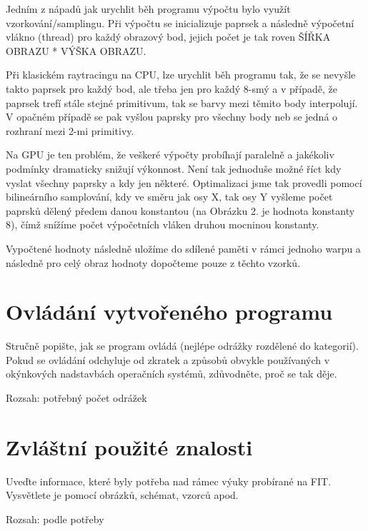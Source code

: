 \documentclass[12pt,a4paper,titlepage,final]{report}
\begin{document}
	\vspace{5mm}
Jedním z nápadů jak urychlit běh programu výpočtu bylo využít vzorkování/samplingu. Při výpočtu se inicializuje paprsek a následně výpočetní vlákno (thread) pro každý obrazový bod, jejich počet je tak roven ŠÍŘKA OBRAZU * VÝŠKA OBRAZU. 
	
	Při klasickém raytracingu na CPU, lze urychlit běh programu tak, že se nevyšle takto paprsek pro každý bod, ale třeba jen pro každý 8-smý a v případě, že paprsek trefí stále stejné primitivum, tak se barvy mezi těmito body interpolují. V opačném případě se pak vyšlou paprsky pro všechny body neb se jedná o rozhraní mezi 2-mi primitivy.
	
	Na GPU je ten problém, že veškeré výpočty probíhají paralelně a jakékoliv podmínky dramaticky snižují výkonnost. Není tak jednoduše možné říct kdy vyslat všechny paprsky a kdy jen některé. Optimalizaci jsme tak provedli pomocí bilineárního samplování, kdy ve směru jak osy X, tak osy Y vyšleme počet paprsků dělený předem danou konstantou (na Obrázku 2. je hodnota konstanty 8), čímž snížíme počet výpočetních vláken druhou mocninou konstanty.
	
	Vypočtené hodnoty následně uložíme do sdílené paměti v rámci jednoho warpu a následně pro celý obraz hodnoty dopočteme pouze z těchto vzorků.




\section{Ovládání vytvořeného programu}

Stručně popište, jak se program ovládá (nejlépe odrážky rozdělené do
kategorií). Pokud se ovládání odchyluje od zkratek a způsobů obvykle
používaných v okýnkových nadstavbách operačních systémů, zdůvodněte, proč se
tak děje.

Rozsah: potřebný počet odrážek

\section{Zvláštní použité znalosti}

Uveďte informace, které byly potřeba nad rámec výuky probírané na FIT.
Vysvětlete je pomocí obrázků, schémat, vzorců apod. 

Rozsah: podle potřeby 
\end{document}
